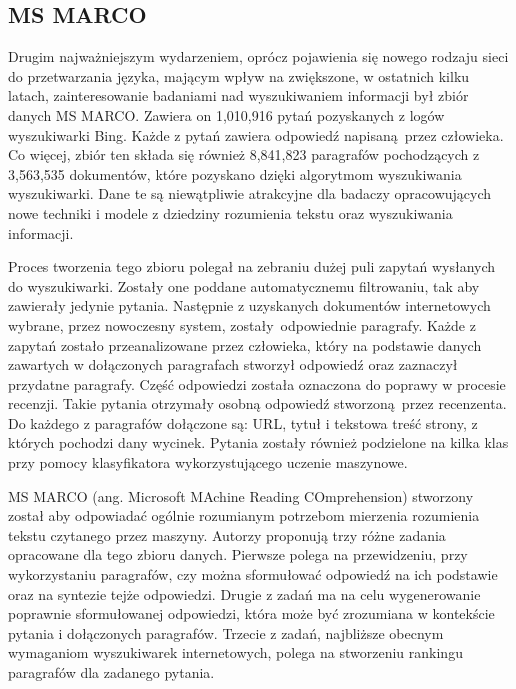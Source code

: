 \subsection{MS MARCO}

Drugim najważniejszym wydarzeniem, oprócz pojawienia się nowego rodzaju sieci do przetwarzania języka, mającym wpływ na zwiększone, w ostatnich kilku latach, zainteresowanie badaniami nad wyszukiwaniem informacji był zbiór danych MS MARCO. Zawiera on 1,010,916 pytań pozyskanych z logów wyszukiwarki Bing. Każde z pytań zawiera odpowiedź napisaną przez człowieka. Co więcej, zbiór ten składa się również 8,841,823 paragrafów pochodzących z 3,563,535 dokumentów, które pozyskano dzięki algorytmom wyszukiwania wyszukiwarki. Dane te są niewątpliwie atrakcyjne dla badaczy opracowujących nowe techniki i modele z dziedziny rozumienia tekstu oraz wyszukiwania informacji. \autocite{bajaj2016ms}\newline

Proces tworzenia tego zbioru polegał na zebraniu dużej puli zapytań wysłanych do wyszukiwarki. Zostały one poddane automatycznemu filtrowaniu, tak aby zawierały jedynie pytania. Następnie z uzyskanych dokumentów internetowych wybrane, przez nowoczesny system, zostały odpowiednie paragrafy. Każde z zapytań zostało przeanalizowane przez człowieka, który na podstawie danych zawartych w dołączonych paragrafach stworzył odpowiedź oraz zaznaczył przydatne paragrafy. Część odpowiedzi została oznaczona do poprawy w procesie recenzji. Takie pytania otrzymały osobną odpowiedź stworzoną przez recenzenta. Do każdego z paragrafów dołączone są: URL, tytuł i tekstowa treść strony, z których pochodzi dany wycinek. Pytania zostały również podzielone na kilka klas przy pomocy klasyfikatora wykorzystującego uczenie maszynowe. \autocite{bajaj2016ms}\newline

MS MARCO (ang. Microsoft MAchine Reading COmprehension) stworzony został aby odpowiadać ogólnie rozumianym potrzebom mierzenia rozumienia tekstu czytanego przez maszyny. Autorzy proponują trzy różne zadania opracowane dla tego zbioru danych. Pierwsze polega na przewidzeniu, przy wykorzystaniu paragrafów, czy można sformułować odpowiedź na ich podstawie oraz na syntezie tejże odpowiedzi. Drugie z zadań ma na celu wygenerowanie poprawnie sformułowanej odpowiedzi, która może być zrozumiana w kontekście pytania i dołączonych paragrafów. Trzecie z zadań, najbliższe obecnym wymaganiom wyszukiwarek internetowych, polega na stworzeniu rankingu paragrafów dla zadanego pytania. \autocite{bajaj2016ms}

